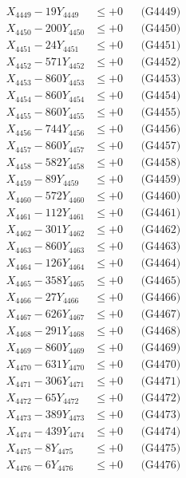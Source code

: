 \documentclass[a4paper,10pt]{article}
\begin{document}
{\begin{align}
X_{4449} - 19Y_{4449} &\leq +0 && \text{(G4449)} \\
X_{4450} - 200Y_{4450} &\leq +0 && \text{(G4450)} \\
\allowbreak
X_{4451} - 24Y_{4451} &\leq +0 && \text{(G4451)} \\
X_{4452} - 571Y_{4452} &\leq +0 && \text{(G4452)} \\
X_{4453} - 860Y_{4453} &\leq +0 && \text{(G4453)} \\
X_{4454} - 860Y_{4454} &\leq +0 && \text{(G4454)} \\
X_{4455} - 860Y_{4455} &\leq +0 && \text{(G4455)} \\
X_{4456} - 744Y_{4456} &\leq +0 && \text{(G4456)} \\
X_{4457} - 860Y_{4457} &\leq +0 && \text{(G4457)} \\
X_{4458} - 582Y_{4458} &\leq +0 && \text{(G4458)} \\
X_{4459} - 89Y_{4459} &\leq +0 && \text{(G4459)} \\
X_{4460} - 572Y_{4460} &\leq +0 && \text{(G4460)} \\
\allowbreak
X_{4461} - 112Y_{4461} &\leq +0 && \text{(G4461)} \\
X_{4462} - 301Y_{4462} &\leq +0 && \text{(G4462)} \\
X_{4463} - 860Y_{4463} &\leq +0 && \text{(G4463)} \\
X_{4464} - 126Y_{4464} &\leq +0 && \text{(G4464)} \\
X_{4465} - 358Y_{4465} &\leq +0 && \text{(G4465)} \\
X_{4466} - 27Y_{4466} &\leq +0 && \text{(G4466)} \\
X_{4467} - 626Y_{4467} &\leq +0 && \text{(G4467)} \\
X_{4468} - 291Y_{4468} &\leq +0 && \text{(G4468)} \\
X_{4469} - 860Y_{4469} &\leq +0 && \text{(G4469)} \\
X_{4470} - 631Y_{4470} &\leq +0 && \text{(G4470)} \\
\allowbreak
X_{4471} - 306Y_{4471} &\leq +0 && \text{(G4471)} \\
X_{4472} - 65Y_{4472} &\leq +0 && \text{(G4472)} \\
X_{4473} - 389Y_{4473} &\leq +0 && \text{(G4473)} \\
X_{4474} - 439Y_{4474} &\leq +0 && \text{(G4474)} \\
X_{4475} - 8Y_{4475} &\leq +0 && \text{(G4475)} \\
X_{4476} - 6Y_{4476} &\leq +0 && \text{(G4476)} \\

\end{align}}
\end{document}
